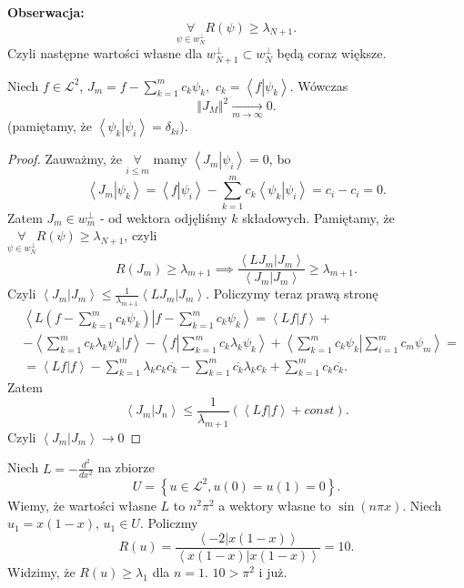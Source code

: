 \documentclass[../main.tex]{subfiles}
\begin{document}
		 \textbf{Obserwacja:}
		 \[
				 \underset{\psi\in w_N^\perp}{\forall} R(\psi) \ge \lambda_{N+1}
		 .\]
		 Czyli następne wartości własne  dla $w_{N+1}^\perp \subset w_N^\perp$ będą coraz większe.
		 \begin{tw}
		 		Niech $f\in \mathcal{L}^2$, $J_m = f - \sum_{k=1}^{m} c_k\psi_k,$ $c_k = \left<f \left| \psi_k\right. \right> $. Wówczas
				 \[
				 \Vert J_M \Vert^2 \underset{m\to\infty}{\longrightarrow}  0
				 .\]
				 (pamiętamy, że $\left<\psi_k \left| \psi_i\right. \right> = \delta_{ki}$).
		 \end{tw}
		 \begin{proof}
		 		Zauważmy, że $\underset{i\le m}{\forall} $ mamy $\left<J_m \left| \psi_i\right. \right> = 0$, bo
				 \[
				 \left<J_m \left| \psi_k\right. \right> = \left<f \left| \psi_i\right. \right> - \sum_{k=1}^{m} c_k \left<\psi_k \left| \psi_i\right. \right> = c_i - c_i = 0
				 .\]
				 Zatem $J_m\in w_m^\perp$ - od wektora odjęliśmy $k$ składowych.
				 Pamiętamy, że $\underset{\psi\in w_N^\perp}{\forall} R(\psi) \ge \lambda_{N+1}$, czyli
				 \[
						 R(J_m) \ge \lambda_{m+1}  \implies \frac{\left<LJ_m \left| J_m\right. \right> }{\left<J_m \left| J_m\right. \right> } \ge \lambda_{m+1}
				 .\]
				 Czyli $\left<J_m \left| J_m\right. \right> \le \frac{1}{\lambda_{m+1}}\left<LJ_m \left| J_m\right. \right> .$ Policzymy teraz prawą stronę
				 \begin{align*}
						 &\left<L\left( f - \sum_{k=1}^{m} c_k\psi_k \right)  \left| f - \sum_{k=1}^{m} c_k\psi_k\right. \right> = \left<Lf \left| f\right. \right> +\\
						 &- \left<\sum_{k=1}^{m} c_k\lambda_k\psi_k \left| f\right. \right> - \left<f \left| \sum_{k=1 }^{m} c_k\lambda_k\psi_k\right. \right> + \left<\sum_{k=1}^{m} c_k\psi_k \left| \sum_{i=1}^{m} c_m\psi_m\right. \right> = \\
						 &= \left<Lf \left| f\right. \right> - \sum_{k=1}^{m} \lambda_kc_k \overline{c_k} - \sum_{k=1}^{m} \overline{c_k} \lambda_k c_k + \sum_{k=1}^{m} c_k \overline{c_k}
				 .\end{align*}
				 Zatem
				 \[
						 \left<J_m \left| J_n\right. \right> \le \frac{1}{\lambda_{m+1}}\left( \left<Lf \left| f\right. \right> + const \right)
				 .\]
				 Czyli $\left<J_m \left| J_m\right. \right> \to 0$
		 \end{proof}
		 Niech $L = - \frac{d^2}{dx^2}$ na zbiorze
		 \[
				 U = \left\{ u\in \mathcal{L}^2, u(0) = u(1) = 0 \right\}
		 .\]
		 Wiemy, że wartości własne $L$ to $n^2\pi^2$ a wektory własne to $\sin(n\pi x)$. Niech $u_1 = x(1-x)$, $u_1\in U$. Policzmy
		 \[
				 R(u) = \frac{\left<-2 \left| x(1-x)\right. \right> }{\left<x(1-x) \left| x(1-x)\right. \right> } = 10
		 .\]
		 Widzimy, że $R(u) \ge \lambda_1$ dla $n=1$. $10 > \pi^2$ i już.
\end{document}
